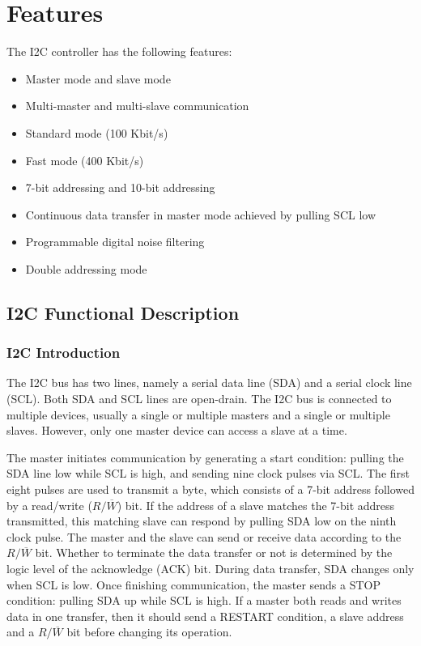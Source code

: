 \documentclass[main\_\_EN.tex]{subfiles}
\begin{document}
\section{Features}

The I2C controller has the following features:

\begin{itemize}
    \item Master mode and slave mode
    \item Multi-master and multi-slave communication
    \item Standard mode (100 Kbit/s)
    \item Fast mode (400 Kbit/s)
    \item 7-bit addressing and 10-bit addressing
    \item Continuous data transfer in master mode achieved by pulling SCL low
    \item Programmable digital noise filtering
    \item Double addressing mode
\end{itemize}

\subsection{I2C Functional Description}

\subsubsection{I2C Introduction}
The I2C bus has two lines, namely a serial data line (SDA) and a serial clock line (SCL). Both SDA and SCL lines are open-drain. The I2C bus is connected to multiple devices, usually a single or multiple masters and a single or multiple slaves. However, only one master device can access a slave at a time.

The master initiates communication by generating a start condition: pulling the SDA line low while SCL is high, and sending nine clock pulses via SCL. The first eight pulses are used to transmit a byte, which consists of a 7-bit address followed by a read/write ($R/\overline W$) bit. If the address of a slave matches the 7-bit address transmitted, this matching slave can respond by pulling SDA low on the ninth clock pulse. The master and the slave can send or receive data according to the $R/\overline W$ bit. Whether to terminate the data transfer or not is determined by the logic level of the acknowledge (ACK) bit. During data transfer, SDA changes only when SCL is low. Once finishing communication, the master sends a STOP condition: pulling SDA up while SCL is high. If a master both reads and writes data in one transfer, then it should send a RESTART condition, a slave address and a $R/\overline W$ bit before changing its operation.
\end{document}
